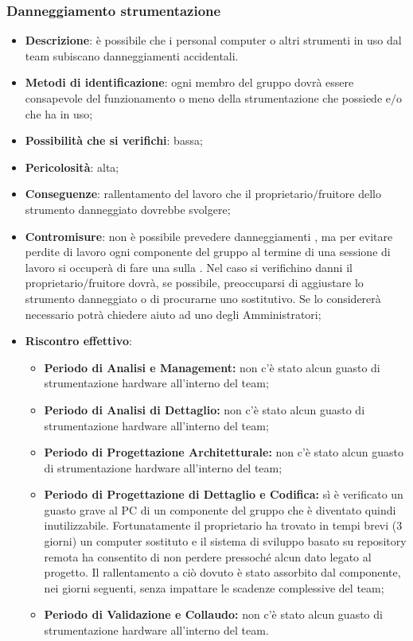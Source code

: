 		\subsubsection{Danneggiamento strumentazione }
			\begin{itemize}
				\item \textbf{Descrizione}: è possibile che i personal computer o altri strumenti in uso dal team subiscano danneggiamenti accidentali.
				\item \textbf{Metodi di identificazione}: ogni membro del gruppo dovrà essere consapevole del funzionamento o meno della strumentazione che possiede e$/$o che ha in uso;
				\item \textbf{Possibilità che si verifichi}: bassa;
				\item \textbf{Pericolosità}: alta;
				\item \textbf{Conseguenze}: rallentamento del lavoro che il proprietario$/$fruitore dello strumento danneggiato dovrebbe svolgere;
				\item \textbf{Contromisure}: non è possibile prevedere danneggiamenti , ma per evitare perdite di lavoro ogni componente del gruppo al termine di una sessione di lavoro si occuperà di fare una  sulla . Nel caso si verifichino danni  il proprietario$/$fruitore dovrà, se possibile, preoccuparsi di aggiustare lo strumento danneggiato o di procurarne uno sostitutivo. Se lo considererà necessario potrà chiedere aiuto ad uno degli Amministratori;
				\item \textbf{Riscontro effettivo}:
				\begin{itemize}
					\item \textbf{Periodo di Analisi e Management:} non c'è stato alcun guasto di strumentazione hardware all'interno del team;
					\item \textbf{Periodo di Analisi di Dettaglio:} non c'è stato alcun guasto di strumentazione hardware all'interno del team;
					\item \textbf{Periodo di Progettazione Architetturale:} non c'è stato alcun guasto di strumentazione hardware all'interno del team;
               \item \textbf{Periodo di Progettazione di Dettaglio e Codifica:} sì è verificato un guasto grave al PC di un componente del gruppo che è diventato quindi inutilizzabile. Fortunatamente il proprietario ha trovato in tempi brevi (3 giorni) un computer sostituto e il sistema di sviluppo basato su repository remota ha consentito di non perdere pressoché alcun dato legato al progetto.
               Il rallentamento a ciò dovuto è stato assorbito dal componente, nei giorni seguenti, senza impattare le scadenze complessive del team;
               \item \textbf{Periodo di Validazione e Collaudo:} non c'è stato alcun guasto di strumentazione hardware all'interno del team.
				\end{itemize}
			\end{itemize}

